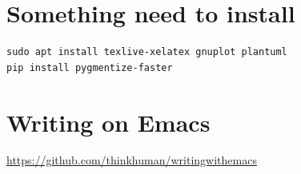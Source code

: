 \documentclass{article}
\author{Oscar Qi}
\date{\today}
\title{}
\begin{document}
\tableofcontents


\section{Something need to install}
\label{sec:org899eb59}
\begin{verbatim}
sudo apt install texlive-xelatex gnuplot plantuml
pip install pygmentize-faster
\end{verbatim}

\section{Writing on Emacs}
\label{sec:org98f6ab2}

\url{https://github.com/thinkhuman/writingwithemacs}
\end{document}
